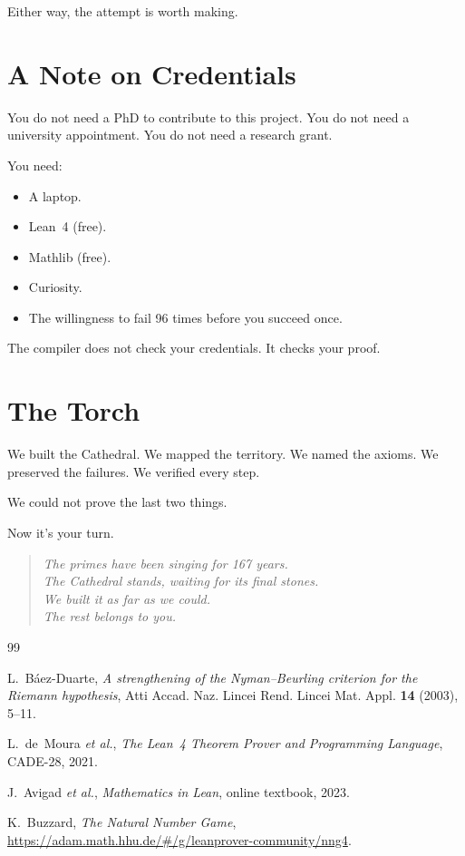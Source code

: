 \documentclass[11pt,a4paper]{article}
\begin{document}
Either way, the attempt is worth making.

\section*{A Note on Credentials}

You do not need a PhD to contribute to this project. You do not
need a university appointment. You do not need a research grant.

You need:
\begin{itemize}
  \item A laptop.
  \item Lean~4 (free).
  \item Mathlib (free).
  \item Curiosity.
  \item The willingness to fail 96 times before you succeed once.
\end{itemize}

The compiler does not check your credentials. It checks your proof.

\section*{The Torch}

We built the Cathedral. We mapped the territory. We named the
axioms. We preserved the failures. We verified every step.

We could not prove the last two things.

Now it's your turn.

\begin{quote}
\emph{The primes have been singing for 167 years.\\
The Cathedral stands, waiting for its final stones.\\
We built it as far as we could.\\
The rest belongs to you.}
\end{quote}

\begin{thebibliography}{99}

L.~B\'aez-Duarte, \emph{A strengthening of the Nyman--Beurling
criterion for the Riemann hypothesis}, Atti Accad. Naz. Lincei
Rend. Lincei Mat. Appl. \textbf{14} (2003), 5--11.

L.~de~Moura \emph{et al.}, \emph{The Lean~4 Theorem Prover and
Programming Language}, CADE-28, 2021.

J.~Avigad \emph{et al.}, \emph{Mathematics in Lean}, online
textbook, 2023.

K.~Buzzard, \emph{The Natural Number Game},
\url{https://adam.math.hhu.de/\#/g/leanprover-community/nng4}.

\end{thebibliography}
\end{document}
